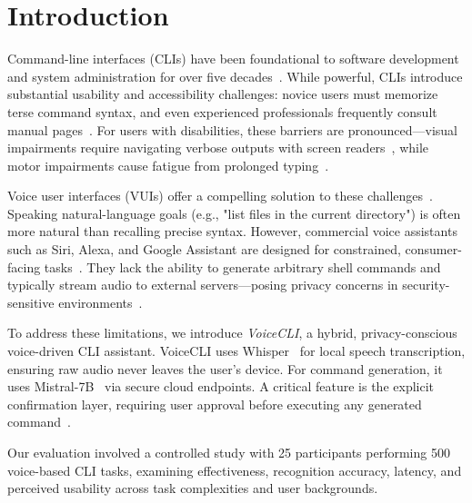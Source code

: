 \documentclass[a4paper,12pt]{article}
\begin{document}
\newpage
{}
\vspace*{-1.8cm}
\setlength{\parskip}{0pt}
\tableofcontents
\newpage
{}


\newpage
\section{Introduction}

\noindent
Command-line interfaces (CLIs) have been foundational to software development and system administration for over five decades~\cite{ref1}. While powerful, CLIs introduce substantial usability and accessibility challenges: novice users must memorize terse command syntax, and even experienced professionals frequently consult manual pages~\cite{ref1}. For users with disabilities, these barriers are pronounced—visual impairments require navigating verbose outputs with screen readers~\cite{ref3}, while motor impairments cause fatigue from prolonged typing~\cite{ref4}.

Voice user interfaces (VUIs) offer a compelling solution to these challenges~\cite{ref5}. Speaking natural-language goals (e.g., "list files in the current directory") is often more natural than recalling precise syntax. However, commercial voice assistants such as Siri, Alexa, and Google Assistant are designed for constrained, consumer-facing tasks~\cite{ref8}. They lack the ability to generate arbitrary shell commands and typically stream audio to external servers—posing privacy concerns in security-sensitive environments~\cite{ref7,ref9}.

To address these limitations, we introduce \textit{VoiceCLI}, a hybrid, privacy-conscious voice-driven CLI assistant. VoiceCLI uses Whisper~\cite{ref10} for local speech transcription, ensuring raw audio never leaves the user's device. For command generation, it uses Mistral-7B~\cite{ref11} via secure cloud endpoints. A critical feature is the explicit confirmation layer, requiring user approval before executing any generated command~\cite{ref12}.

Our evaluation involved a controlled study with 25 participants performing 500 voice-based CLI tasks, examining effectiveness, recognition accuracy, latency, and perceived usability across task complexities and user backgrounds.
\end{document}
